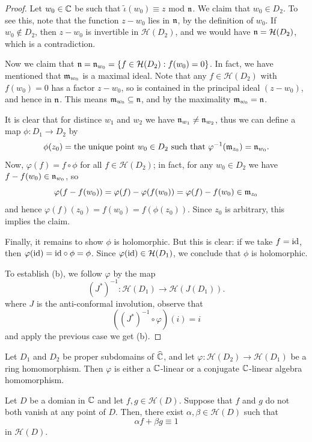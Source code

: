 \begin{proof}
Let $w_0\in\mathbb{C}$ be such that $\widetilde{\iota}(w_0)\equiv z$ mod $\mathfrak{n}$. We claim that $w_0\in D_2$. To see this, note that the function $z-w_0$ lies in $\mathfrak{n}$, by the definition of $w_0$. If $w_0\notin D_2$, then $z-w_0$ is invertible in $\mathcal{H}(D_2)$, and we would have $\mathfrak{n}=\mathcal{H}(D_2)$, which is a contradiction.\par
Now we claim that $\mathfrak{n}=\mathfrak{n}_{w_0}=\{f\in\mathcal{H}(D_2):f(w_0)=0\}$. In fact, we have mentioned that $\mathfrak{m}_{w_0}$ is a maximal ideal. Note that any $f\in\mathcal{H}(D_2)$ with $f(w_0)=0$ has a factor $z-w_0$, so is contained in the principal ideal $(z-w_0)$, and hence in $\mathfrak{n}$. This means $\mathfrak{m}_{w_0}\subseteq\mathfrak{n}$, and by the maximality $\mathfrak{m}_{w_0}=\mathfrak{n}$.\par
It is clear that for distince $w_1$ and $w_2$ we have $\mathfrak{n}_{w_1}\neq\mathfrak{n}_{w_2}$, thus we can define a map $\phi:D_1\to D_2$ by
\[\phi(z_0)=\text{the unique point $w_0\in D_2$ such that $\varphi^{-1}(\mathfrak{m}_{z_0})=\mathfrak{n}_{w_0}$}.\]
Now, $\varphi(f)=f\circ\phi$ for all $f\in\mathcal{H}(D_2)$; in fact, for any $w_0\in D_2$ we have $f-f(w_0)\in\mathfrak{n}_{w_0}$, so
\[\varphi(f-f(w_0))=\varphi(f)-\varphi(f(w_0))=\varphi(f)-f(w_0)\in\mathfrak{m}_{z_0}\]
and hence $\varphi(f)(z_0)=f(w_0)=f(\phi(z_0))$. Since $z_0$ is arbitrary, this implies the claim.\par
Finally, it remains to show $\phi$ is holomorphic. But this is clear: if we take $f=\mathrm{id}$, then $\varphi(\mathrm{id})=\mathrm{id}\circ\phi=\phi$. Since $\varphi(\mathrm{id})\in\mathcal{H}(D_1)$, we conclude that $\phi$ is holomorphic.\par
To establish (b), we follow $\varphi$ by the map
\[(J^*)^{-1}:\mathcal{H}(D_1)\to\mathcal{H}(J(D_1)).\]
where $J$ is the anti-conformal involution, observe that
\[((J^*)^{-1}\circ\varphi)(i)=i\]
and apply the previous case we get (b).
\end{proof}
\begin{corollary}
Let $D_1$ and $D_2$ be proper subdomains of $\widehat{\mathbb{C}}$, and let $\varphi:\mathcal{H}(D_2)\to\mathcal{H}(D_1)$ be a ring homomorphism. Then $\varphi$ is either a $\mathbb{C}$-linear or a conjugate $\mathbb{C}$-linear algebra homomorphism.
\end{corollary}
\begin{proposition}
Let $D$ be a domian in $\mathbb{C}$ and let $f,g\in\mathcal{H}(D)$. Suppose that $f$ and $g$ do not both vanish at any point of $D$. Then, there exist $\alpha,\beta\in\mathcal{H}(D)$ such that
\[\alpha f+\beta g\equiv 1\]
in $\mathcal{H}(D)$.
\end{proposition}
